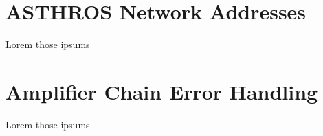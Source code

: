 \chapter{ASTHROS Network Addresses}
Lorem those ipsums
\label{readout/app:hosts}

\chapter{Amplifier Chain Error Handling}
Lorem those ipsums
\label{readout/app:if_amp_errors}